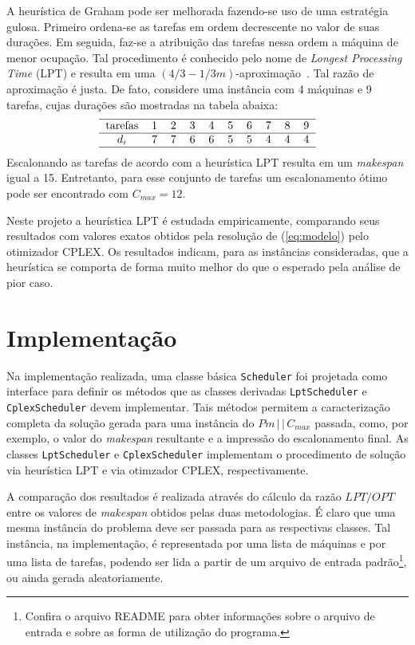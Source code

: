 \documentclass[12pt,a4paper]{article}
\newcommand{\zerar}{\setcounter{equation}{0}\setcounter{figure}{0}\setcounter{table}{0}}
\begin{document}
A heurística de Graham pode ser melhorada fazendo-se uso de uma estratégia gulosa. Primeiro 
ordena-se as tarefas em ordem decrescente no valor de suas durações. Em seguida, faz-se a atribuição
das tarefas nessa ordem a máquina de menor ocupação. Tal procedimento é conhecido pelo nome de {\it 
Longest Processing Time} (LPT) e resulta em uma $(4/3-1/3m)$-aproximação~\cite{shmoys}. Tal razão de 
aproximação é justa. De fato, considere uma instância com 4 máquinas e 9 tarefas, cujas durações são 
mostradas na tabela abaixa: 
%
\begin{equation*}
  \begin{tabular}{cccccccccc}
    \hline
    tarefas & 1 & 2 & 3 & 4 & 5 & 6 & 7 & 8 & 9 \\
    \hline
    $d_i$ & 7 & 7 & 6 & 6 & 5 & 5 & 4 & 4 & 4 \\
    \hline
  \end{tabular} 
\end{equation*}
%
Escalonando as tarefas de acordo com a heurística LPT resulta em um {\it makespan} igual a 15. 
Entretanto, para esse conjunto de tarefas um escalonamento ótimo pode ser encontrado com 
$C_{max} = 12$.

Neste projeto a heurística LPT é estudada empiricamente, comparando seus resultados com valores 
exatos obtidos pela resolução de (\ref{eq:modelo}) pelo otimizador CPLEX. Os resultados indicam, 
para as instâncias consideradas, que a heurística se comporta de forma muito melhor do que o 
esperado pela análise de pior caso.


\zerar
\section{Implementação}

Na implementação realizada, uma classe básica \verb|Scheduler| foi projetada como interface para 
definir os métodos que as classes derivadas \verb|LptScheduler| e \verb|CplexScheduler| devem 
implementar. Tais métodos permitem a caracterização completa da solução gerada para uma instância do 
$Pm\,|\,|\,C_{max}$ passada, como, por exemplo, o valor do {\it makespan} resultante e a impressão
do escalonamento final. As classes \verb|LptScheduler| e \verb|CplexScheduler| implementam o 
procedimento de solução via heurística LPT e via otimzador CPLEX, respectivamente.

A comparação dos resultados é realizada através do cálculo da razão $LPT/OPT$ entre os valores de 
{\it makespan} obtidos pelas duas metodologias. É claro que uma mesma instância do problema deve ser
passada para as respectivas classes. Tal instância, na implementação, é representada por uma lista 
de máquinas e por uma lista de tarefas, podendo ser lida a partir de um arquivo de entrada 
padrão\footnote{Confira o arquivo README para obter informações sobre o arquivo de entrada e 
sobre as forma de utilização do programa.}, ou ainda gerada aleatoriamente.
\end{document}
